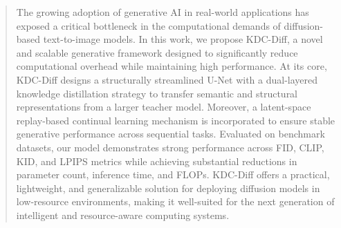 \documentclass[a4paper,fleqn]{ieeetj}
\begin{document}
\begin{abstract}
The growing adoption of generative AI in real-world applications has exposed a critical bottleneck in the computational demands of diffusion-based text-to-image models. In this work, we propose KDC-Diff, a novel and scalable generative framework designed to significantly reduce computational overhead while maintaining high performance. At its core, KDC-Diff designs a structurally streamlined U-Net with a dual-layered knowledge distillation strategy to transfer semantic and structural representations from a larger teacher model. Moreover, a latent-space replay-based continual learning mechanism is incorporated to ensure stable generative performance across sequential tasks. Evaluated on benchmark datasets, our model demonstrates strong performance across FID, CLIP, KID, and LPIPS metrics while achieving substantial reductions in parameter count, inference time, and FLOPs. KDC-Diff offers a practical, lightweight, and generalizable solution for deploying diffusion models in low-resource environments, making it well-suited for the next generation of intelligent and resource-aware computing systems.

\end{abstract}


\end{document}
